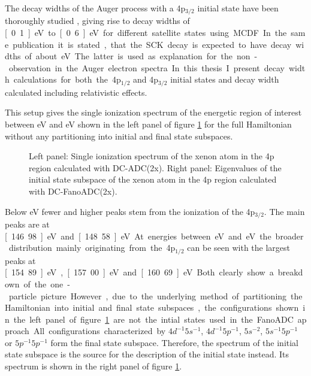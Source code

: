 The decay widths of the Auger process with a 4p$_{3/2}$ initial state have
been thoroughly studied \cite{}, giving rise to decay widths of \unit[0.1]{eV} to
\unit[0.6]{eV} for different satellite states using \ac{MCDF}. In the same publication
it is stated, that the \ac{SCK} decay is expected to have decay widths of
about \unit[10--100]{eV}. The latter is used as explanation for the non-observation
in the Auger electron spectra.

In this thesis I present decay width calculations for both the 4p$_{1/2}$ and
4p$_{3/2}$ initial states and decay width calculated including relativistic
effects.

This setup gives the single ionization spectrum of the energetic region of
interest between \unit[140]{eV} and \unit[170]{eV} shown in the left panel of
figure
\ref{figure:Xe4p_SIPs} for the full Hamiltonian without any partitioning
into initial and final state subspaces.

\begin{figure}[]
  \centering
  
  
  \caption{Left panel: Single ionization spectrum of the xenon atom in the 4p region
           calculated with DC-ADC(2x).
           Right panel: Eigenvalues of the initial state subspace of the                 
           xenon atom in the 4p region                                      
           calculated with DC-FanoADC(2x).}
  \label{figure:Xe4p_SIPs}
\end{figure}

Below \unit[150]{eV} fewer and higher peaks stem from the ionization of the
4p$_{3/2}$. The main peaks are at \unit[146.98]{eV} and \unit[148.58]{eV}.
At energies between \unit[150]{eV} and \unit[165]{eV} the broader
distribution mainly originating from the 4p$_{1/2}$ can be seen with the largest
peaks at \unit[154.89]{eV}, \unit[157.00]{eV} and \unit[160.69]{eV}. Both clearly
show a breakdown of the one-particle picture.

However, due to the underlying method of partitioning the Hamiltonian into
initial and final state subspaces, the configurations shown in the left panel of figure
\ref{figure:Xe4p_SIPs} are not the intial states used in the FanoADC approach.
All configurations characterized by $4d^{-1}5s^{-1}$, $4d^{-1}5p^{-1}$,
$5s^{-2}$, $5s^{-1}5p^{-1}$ or $5p^{-1}5p^{-1}$ form the final state subspace.
Therefore, the spectrum of the initial state subspace is the source for
the description of the initial state instead. Its spectrum is shown in
the right panel of figure \ref{figure:Xe4p_SIPs}.

